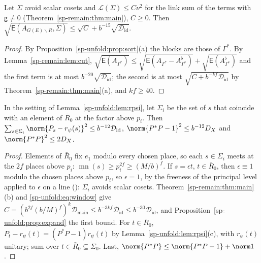 \begin{proposition}
\label{sp-unfold:prop:expand}
Let $\Sigma$ avoid scalar cosets and $\mathcal L(\Sigma)\le C\nu^2$ for the link sum of the terms
with $\mathsf g\ne0$ (Theorem~\ref{sp-remain:thm:main}), $C\ge0$. Then $\sqrt{\mathsf
E(A_{G(E)\smallsetminus R},\Sigma)}\le\sqrt C+b^{-15}\sqrt{\mathcal D_{\mathrm{id}}}$.
\end{proposition}

\begin{proof}
By Proposition~\ref{sp-unfold:prop:sort}(a) the blocks are those of $\Gamma^*$. By
Lemma~\ref{sp-remain:lem:cut}, $\sqrt{\mathsf E(A_{\Gamma^*})}\le\sqrt{\mathsf
E(A_{\Gamma^*}-A^\flat_{\Gamma^*})}+\sqrt{\mathsf E(A^\flat_{\Gamma^*})}$ and the first term is at most
$b^{-20}\sqrt{\mathcal D_{\mathrm{id}}}$; the second is at most $\sqrt{C+b^{-kf}\mathcal
D_{\mathrm{id}}}$ by Theorem~\ref{sp-remain:thm:main}(a), and $kf\ge40$.
\end{proof}

\begin{proposition}\label{sp-unfold:prop:near}
In the setting of Lemma~\ref{sp-unfold:lem:rpsi}, let $\Sigma_i$ be the set of $s$ that coincide
with an element of $\bar R_0$ at the factor above $p_i$. Then $\sum_{s\in\Sigma_i}\norm{P_s-r_\psi(s)}^2\le b^{-12}\mathcal
D_{\mathrm{id}}$, $\norm{P^*P-1}^2\le b^{-12}D_X$ and $\norm{P^*P}^2\le2D_X$.
\end{proposition}

\begin{proof}
Elements of $\bar R_0$ fix $e_1$ modulo every chosen place, so each $s\in\Sigma_i$ meets at the $2f$
places above $p_i$: $\operatorname{mn}(s)\ge p_i^{2f}\ge(M/b)^f$. If $s=\epsilon t$, $t\in\bar R_0$,
then $\epsilon\equiv1$ modulo the chosen places above $p_i$, so $\epsilon=1$, by the freeness of the principal
level applied to $\epsilon$ on a line (): $\Sigma_i$
avoids scalar cosets. Theorem~\ref{sp-remain:thm:main}(b) and \eqref{sp-unfold:eq:window} give
$C=(b^{2f}(b/M)^f)^k\mathcal D_{\mathrm{main}}\le b^{-3kf}\mathcal D_{\mathrm{id}}\le
b^{-30}\mathcal D_{\mathrm{id}}$, and Proposition~\ref{sp-unfold:prop:expand} the first bound. For
$t\in\bar R_0$, $P_t-r_\psi(t)=(P^*P-1)r_\psi(t)$ by Lemma~\ref{sp-unfold:lem:rpsi}(c), with $r_\psi(t)$
unitary; sum over $t\in\bar R_0\subseteq\Sigma_0$. Last, $\norm{P^*P}\le\norm{P^*P-1}+\norm1$.
\end{proof}

